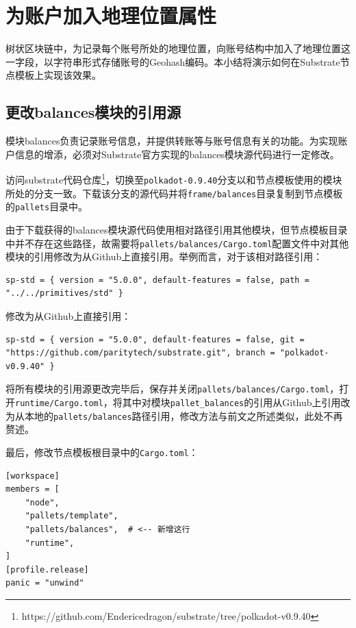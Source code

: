 \section{为账户加入地理位置属性}

树状区块链中，为记录每个账号所处的地理位置，向账号结构中加入了地理位置这一字段，以字符串形式存储账号的Geohash编码。本小结将演示如何在Substrate节点模板上实现该效果。

\subsection{更改balances模块的引用源}

模块balances负责记录账号信息，并提供转账等与账号信息有关的功能。为实现账户信息的增添，必须对Substrate官方实现的balances模块源代码进行一定修改。

访问substrate代码仓库\footnote{https://github.com/Endericedragon/substrate/tree/polkadot-v0.9.40}，切换至\verb|polkadot-0.9.40|分支以和节点模板使用的模块所处的分支一致。下载该分支的源代码并将\verb|frame/balances|目录复制到节点模板的\verb|pallets|目录中。

由于下载获得的balances模块源代码使用相对路径引用其他模块，但节点模板目录中并不存在这些路径，故需要将\verb|pallets/balances/Cargo.toml|配置文件中对其他模块的引用修改为从Github上直接引用。举例而言，对于该相对路径引用：

\begin{lstlisting}
sp-std = { version = "5.0.0", default-features = false, path = "../../primitives/std" }

\end{lstlisting}

修改为从Github上直接引用：

\begin{lstlisting}
sp-std = { version = "5.0.0", default-features = false, git = "https://github.com/paritytech/substrate.git", branch = "polkadot-v0.9.40" }
\end{lstlisting}

将所有模块的引用源更改完毕后，保存并关闭\verb|pallets/balances/Cargo.toml|，打开\verb|runtime/Cargo.toml|，将其中对模块\verb|pallet_balances|的引用从Github上引用改为从本地的\verb|pallets/balances|路径引用，修改方法与前文之所述类似，此处不再赘述。

最后，修改节点模板根目录中的\verb|Cargo.toml|：

\begin{lstlisting}
[workspace]
members = [
    "node",
    "pallets/template",
    "pallets/balances",  # <-- 新增这行
    "runtime",
]
[profile.release]
panic = "unwind"
\end{lstlisting}

